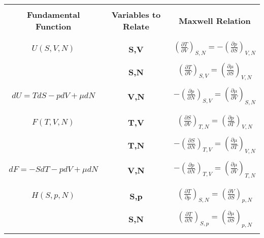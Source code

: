 \documentclass{article}
\begin{document}
\renewcommand{\arraystretch}{1.3}  %
\setlength{\tabcolsep}{10pt}       %
\setlength{\arrayrulewidth}{0.5pt} %

\begin{tabular}{|>{\Large\bfseries}c|>{\Large\bfseries}c|>{\Large\bfseries}c|}
    \hline
    & & \\
    \LARGE{Fundamental Function} & \LARGE{Variables to Relate} & \LARGE{Maxwell Relation} \\
    & & \\
    \hline
    & & \\
    \normalfont $U(S,V,N)$ & \normalfont S,V & \normalfont $(\frac{\partial T}{\partial V})_{S,N} = -(\frac{\partial p}{\partial S})_{V,N}$ \\
    & & \\
    & \normalfont S,N &  \normalfont $(\frac{\partial T}{\partial V})_{S,V}=(\frac{\partial \mu}{\partial S})_{V,N}$ \\
    & & \\
    $dU=TdS-pdV+ \mu dN$ & \normalfont V,N & \normalfont $-(\frac{\partial p}{\partial N})_{S,V} = (\frac{\partial \mu}{\partial V})_{S,N}$ \\
    & &  \\
    \hline
    & & \\
    \normalfont $F(T,V,N)$ & \normalfont T,V & \normalfont $(\frac{\partial S}{\partial V})_{T,N}= (\frac{\partial p}{\partial T})_{V,N}$ \\
    & & \\
    & \normalfont  T,N & \normalfont $-(\frac{\partial S}{\partial N})_{T,V}= (\frac{\partial \mu }{\partial T})_{V,N} $ \\
    & & \\
    \normalfont $dF=-SdT-pdV+ \mu dN$ & \normalfont V,N & \normalfont $-(\frac{\partial p}{\partial N})_{T,V} = (\frac{\partial \mu }{\partial V})_{T,N} $ \\
    & & \\
    \hline
    & & \\
    \normalfont $H(S,p,N)$ & \normalfont S,p & \normalfont $ (\frac{\partial T}{\partial p})_{S,N}= (\frac{\partial V}{\partial S})_{p,N}$ \\
    & & \\
    & \normalfont S,N & \normalfont $(\frac{\partial T}{\partial N})_{S,p}= (\frac{\partial \mu }{\partial S})_{p,N}$ \\
    & & \\

\end{tabular}
\end{document}
